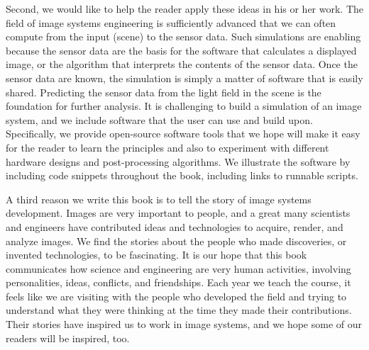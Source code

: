 \documentclass[
  letterpaper,
]{book}
\begin{document}
Second, we would like to help the reader apply these ideas in his or her
work. The field of image systems engineering is sufficiently advanced
that we can often compute from the input (scene) to the sensor data.
Such simulations are enabling because the sensor data are the basis for
the software that calculates a displayed image, or the algorithm that
interprets the contents of the sensor data. Once the sensor data are
known, the simulation is simply a matter of software that is easily
shared. Predicting the sensor data from the light field in the scene is
the foundation for further analysis. It is challenging to build a
simulation of an image system, and we include software that the user can
use and build upon. Specifically, we provide open-source software tools
that we hope will make it easy for the reader to learn the principles
and also to experiment with different hardware designs and
post-processing algorithms. We illustrate the software by including code
snippets throughout the book, including links to runnable scripts.

A third reason we write this book is to tell the story of image systems
development. Images are very important to people, and a great many
scientists and engineers have contributed ideas and technologies to
acquire, render, and analyze images. We find the stories about the
people who made discoveries, or invented technologies, to be
fascinating. It is our hope that this book communicates how science and
engineering are very human activities, involving personalities, ideas,
conflicts, and friendships. Each year we teach the course, it feels like
we are visiting with the people who developed the field and trying to
understand what they were thinking at the time they made their
contributions. Their stories have inspired us to work in image systems,
and we hope some of our readers will be inspired, too.
\end{document}
